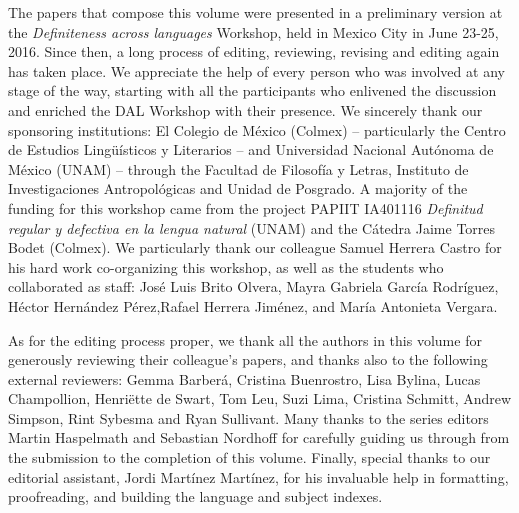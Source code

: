 \documentclass[output=paper]{langsci/langscibook}
\begin{document}
The papers that compose this volume were presented in a preliminary version at the \textit{Definiteness across languages} Workshop, held in Mexico City in June 23-25, 2016. Since then, a long process of editing, reviewing, revising and editing again has taken place. We appreciate the help of every person who was involved at any stage of the way, starting with all the participants who enlivened the discussion and enriched the DAL Workshop with their presence. We sincerely thank our sponsoring institutions: El Colegio de México (Colmex) -- particularly the Centro de Estudios Lingüísticos y Literarios -- and Universidad Nacional Autónoma de México (UNAM) -- through the Facultad de Filosofía y Letras, Instituto de Investigaciones Antropológicas and Unidad de Posgrado. A majority of the funding for this workshop came from the project PAPIIT IA401116 \textit{Definitud regular y defectiva en la lengua natural} (UNAM) and the Cátedra Jaime Torres Bodet (Colmex). We particularly thank our colleague Samuel Herrera Castro for his hard work co-organizing this workshop, as well as the students who collaborated as staff: José Luis Brito Olvera, Mayra Gabriela García Rodríguez, Héctor Hernández Pérez,\largerpage Rafael Herrera Jiménez, and María Antonieta Vergara.\newpage 

As for the editing process proper, we thank all the authors in this volume for generously reviewing their colleague’s papers, and thanks also to the following external reviewers: Gemma Barberá, Cristina Buenrostro, Lisa Bylina, Lucas Champollion, Henri\"ette de Swart, Tom Leu, Suzi Lima, Cristina Schmitt, Andrew Simpson, Rint Sybesma and Ryan Sullivant. Many thanks to the series editors Martin Haspelmath and Sebastian Nordhoff for carefully guiding us through from the submission to the completion of this volume. Finally, special thanks to our editorial assistant, Jordi Martínez Martínez, for his invaluable help in formatting, proofreading, and building the language and subject indexes.

{\sloppy
\printbibliography[heading=subbibliography,notkeyword=this]
}
\end{document}
